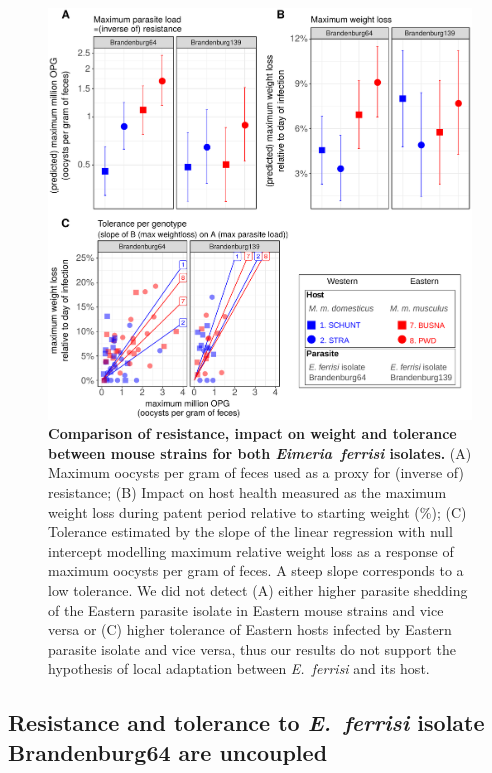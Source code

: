 \begin{figure}[H]
    \centering
    \includegraphics[width=\linewidth,height=\textheight,keepaspectratio]{images/3article2/Fig3_final.pdf}
    \caption{\textbf{Comparison of resistance, impact on weight and tolerance between mouse strains for both \textit{Eimeria~ferrisi} isolates.} (A) Maximum oocysts per gram of feces used as a proxy for (inverse of) resistance; (B) Impact on host health measured as the maximum weight loss during patent period relative to starting weight (\%); (C) Tolerance estimated by the slope of the linear regression with null intercept modelling maximum relative weight loss as a response of maximum oocysts per gram of feces. A steep slope corresponds to a low tolerance. We did not detect (A) either higher parasite shedding of the Eastern parasite isolate in Eastern mouse strains and vice versa or (C) higher tolerance of Eastern hosts infected by Eastern parasite isolate and vice versa, thus our results do not support the hypothesis of local adaptation between \textit{E.~ferrisi} and its host.}
\end{figure}

\subsection{Resistance and tolerance to \textit{E.~ferrisi }isolate Brandenburg64 are uncoupled}

